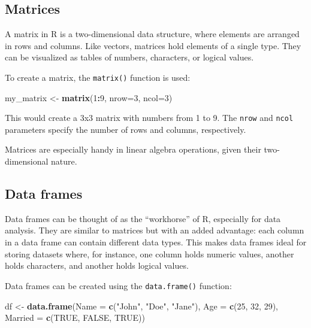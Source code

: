 \documentclass[
  b5paper]{book}
\newenvironment{Shaded}{\begin{snugshade}}{\end{snugshade}}
\newcommand{\AttributeTok}[1]{\textcolor[rgb]{0.13,0.29,0.53}{#1}}
\newcommand{\ConstantTok}[1]{\textcolor[rgb]{0.56,0.35,0.01}{#1}}
\newcommand{\DecValTok}[1]{\textcolor[rgb]{0.00,0.00,0.81}{#1}}
\newcommand{\FunctionTok}[1]{\textcolor[rgb]{0.13,0.29,0.53}{\textbf{#1}}}
\newcommand{\NormalTok}[1]{#1}
\newcommand{\OtherTok}[1]{\textcolor[rgb]{0.56,0.35,0.01}{#1}}
\newcommand{\SpecialCharTok}[1]{\textcolor[rgb]{0.81,0.36,0.00}{\textbf{#1}}}
\newcommand{\StringTok}[1]{\textcolor[rgb]{0.31,0.60,0.02}{#1}}
\begin{document}
\hypertarget{matrices}{%
\subsection*{Matrices}\label{matrices}}

A matrix in R is a two-dimensional data structure, where elements are arranged in rows and columns. Like vectors, matrices hold elements of a single type. They can be visualized as tables of numbers, characters, or logical values.

To create a matrix, the \texttt{matrix()} function is used:

\begin{Shaded}
\begin{Highlighting}[]
\NormalTok{my\_matrix }\OtherTok{\textless{}{-}} \FunctionTok{matrix}\NormalTok{(}\DecValTok{1}\SpecialCharTok{:}\DecValTok{9}\NormalTok{, }\AttributeTok{nrow=}\DecValTok{3}\NormalTok{, }\AttributeTok{ncol=}\DecValTok{3}\NormalTok{)}
\end{Highlighting}
\end{Shaded}

This would create a 3x3 matrix with numbers from 1 to 9. The \texttt{nrow} and \texttt{ncol} parameters specify the number of rows and columns, respectively.

Matrices are especially handy in linear algebra operations, given their two-dimensional nature.

\hypertarget{data-frames}{%
\subsection*{Data frames}\label{data-frames}}

Data frames can be thought of as the ``workhorse'' of R, especially for data analysis. They are similar to matrices but with an added advantage: each column in a data frame can contain different data types. This makes data frames ideal for storing datasets where, for instance, one column holds numeric values, another holds characters, and another holds logical values.

Data frames can be created using the \texttt{data.frame()} function:

\begin{Shaded}
\begin{Highlighting}[]
\NormalTok{df }\OtherTok{\textless{}{-}} \FunctionTok{data.frame}\NormalTok{(}\AttributeTok{Name =} \FunctionTok{c}\NormalTok{(}\StringTok{"John"}\NormalTok{, }\StringTok{"Doe"}\NormalTok{, }\StringTok{"Jane"}\NormalTok{), }\AttributeTok{Age =} \FunctionTok{c}\NormalTok{(}\DecValTok{25}\NormalTok{, }\DecValTok{32}\NormalTok{, }\DecValTok{29}\NormalTok{), }\AttributeTok{Married =} \FunctionTok{c}\NormalTok{(}\ConstantTok{TRUE}\NormalTok{, }\ConstantTok{FALSE}\NormalTok{, }\ConstantTok{TRUE}\NormalTok{))}
\end{Highlighting}
\end{Shaded}
\end{document}
